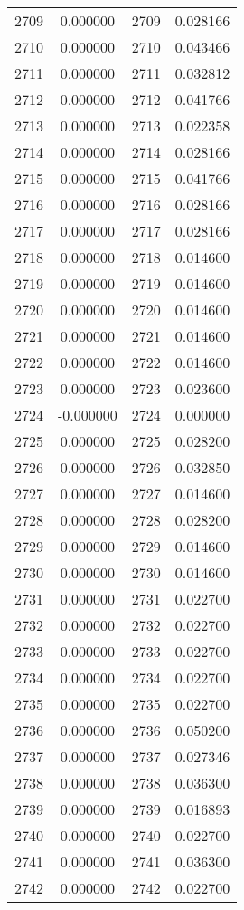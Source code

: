 \documentclass[12pt]{article}
\begin{document}
\begin{longtable}{@{}cccc@{}}
2709 & 0.000000 & 2709 & 0.028166 \\
2710 & 0.000000 & 2710 & 0.043466 \\
2711 & 0.000000 & 2711 & 0.032812 \\
2712 & 0.000000 & 2712 & 0.041766 \\
2713 & 0.000000 & 2713 & 0.022358 \\
2714 & 0.000000 & 2714 & 0.028166 \\
2715 & 0.000000 & 2715 & 0.041766 \\
2716 & 0.000000 & 2716 & 0.028166 \\
2717 & 0.000000 & 2717 & 0.028166 \\
2718 & 0.000000 & 2718 & 0.014600 \\
2719 & 0.000000 & 2719 & 0.014600 \\
2720 & 0.000000 & 2720 & 0.014600 \\
2721 & 0.000000 & 2721 & 0.014600 \\
2722 & 0.000000 & 2722 & 0.014600 \\
2723 & 0.000000 & 2723 & 0.023600 \\
2724 & -0.000000 & 2724 & 0.000000 \\
2725 & 0.000000 & 2725 & 0.028200 \\
2726 & 0.000000 & 2726 & 0.032850 \\
2727 & 0.000000 & 2727 & 0.014600 \\
2728 & 0.000000 & 2728 & 0.028200 \\
2729 & 0.000000 & 2729 & 0.014600 \\
2730 & 0.000000 & 2730 & 0.014600 \\
2731 & 0.000000 & 2731 & 0.022700 \\
2732 & 0.000000 & 2732 & 0.022700 \\
2733 & 0.000000 & 2733 & 0.022700 \\
2734 & 0.000000 & 2734 & 0.022700 \\
2735 & 0.000000 & 2735 & 0.022700 \\
2736 & 0.000000 & 2736 & 0.050200 \\
2737 & 0.000000 & 2737 & 0.027346 \\
2738 & 0.000000 & 2738 & 0.036300 \\
2739 & 0.000000 & 2739 & 0.016893 \\
2740 & 0.000000 & 2740 & 0.022700 \\
2741 & 0.000000 & 2741 & 0.036300 \\
2742 & 0.000000 & 2742 & 0.022700 \\

\end{longtable}
\end{document}
